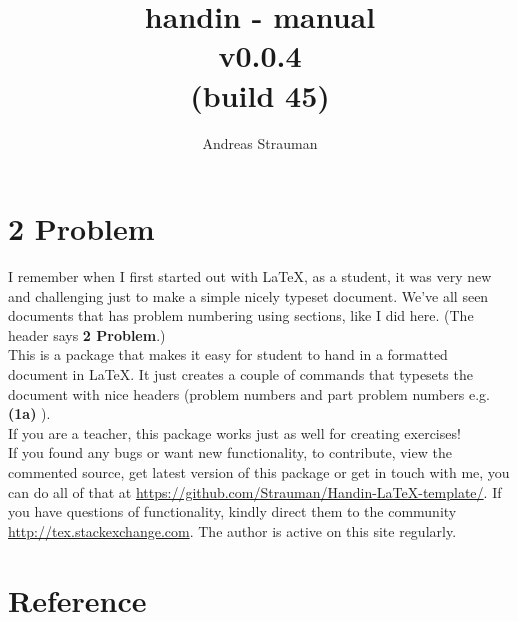 \documentclass{article}
\title{{handin - manual\\ v0.0.4{\\[-0.5em]\footnotesize(build 45)}}}
\author{Andreas Strauman}
\let\oldsection\section
\gdef\section{\needspace{0.3\paperheight}\oldsection}
\begin{document}
\maketitle
\section*{2 Problem}
I remember when I first started out with LaTeX, as a student, it was very new and challenging just to make a simple nicely typeset document. We've all seen documents that has problem numbering using sections, like I did here. (The header says \textbf{2 Problem}.)\\

This is a package that makes it easy for student to hand in a formatted document in LaTeX. It just creates a couple of commands that typesets the document with nice headers (problem numbers and part problem numbers e.g. \textbf{(1a)} ).\\

If you are a teacher, this package works just as well for creating exercises!\\
 
If you found any bugs or want new functionality, to contribute, view the commented source, get latest version of this package or get in touch with me, you can do all of that at \url{https://github.com/Strauman/Handin-LaTeX-template/}. If you have questions of functionality, kindly direct them to the community\\ \url{http://tex.stackexchange.com}. The author is active on this site regularly.

\tableofcontents
\clearpage
 \section{Reference}
\end{document}
